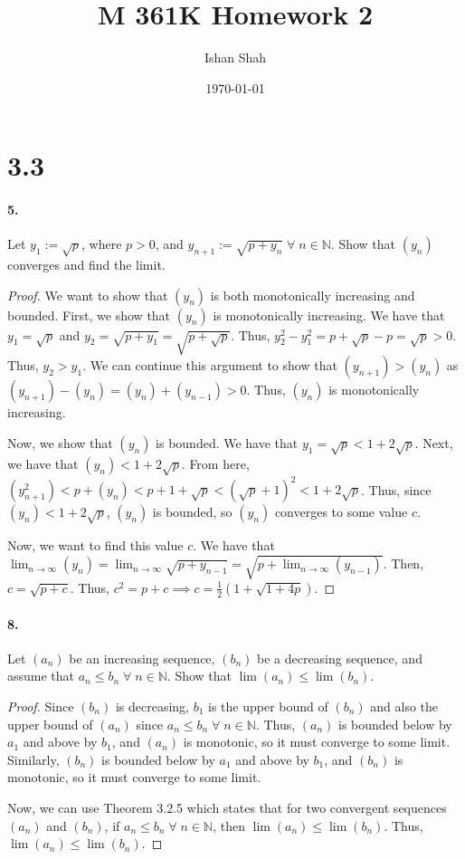 \documentclass[12pt]{article}
\newcommand\N{\mathbb{N}}
\theoremstyle{remark}
\begin{document}
\title{M 361K Homework 2}
\author{Ishan Shah}
\date{\today}
\maketitle

\section*{3.3}
\paragraph{5.} Let $y_1 := \sqrt{p}$, where $p > 0$, and $y_{n + 1} := \sqrt{p + y_n} \;\forall\; n \in \N$. Show that $(y_n)$ converges and find the limit.
\begin{proof}
    We want to show that $(y_n)$ is both monotonically increasing and bounded. First, we show that $(y_n)$ is monotonically increasing. We have that $y_1 = \sqrt{p}$ and $y_2 = \sqrt{p + y_1} = \sqrt{p + \sqrt{p}}$. Thus, $y_2^2 - y_1^2 = p + \sqrt{p} - p = \sqrt{p} > 0$. Thus, $y_2 > y_1$. We can continue this argument to show that $(y_{n + 1}) > (y_n)$ as $(y_{n + 1}) - (y_n) = (y_n) + (y_{n - 1}) > 0$. Thus, $(y_n)$ is monotonically increasing.
    
    Now, we show that $(y_n)$ is bounded. We have that $y_1 = \sqrt{p} < 1 + 2\sqrt{p}$. Next, we have that $(y_n) < 1 + 2\sqrt{p}$. From here, $(y_{n + 1}^2) < p + (y_n) < p + 1 + \sqrt{p} < (\sqrt{p} + 1)^2 < 1 + 2\sqrt{p}$. Thus, since $(y_n) < 1 + 2\sqrt{p}$, $(y_n)$ is bounded, so $(y_n)$ converges to some value $c$.

    Now, we want to find this value $c$. We have that $\lim_{n \to \infty} (y_n) = \lim_{n \to \infty} \sqrt{p + y_{n - 1}} = \sqrt{p + \lim_{n \to \infty} (y_{n - 1})}$. Then, $c = \sqrt{p + c}$. Thus, $c^2 = p + c \implies c = \frac{1}{2}(1 + \sqrt{1 + 4p})$.
\end{proof}

\paragraph{8.} Let $(a_n)$ be an increasing sequence, $(b_n)$ be a decreasing sequence, and assume that $a_n \leq b_n \;\forall\; n \in \N$. Show that $\lim(a_n) \leq \lim(b_n)$.
\begin{proof}
    Since $(b_n)$ is decreasing, $b_1$ is the upper bound of $(b_n)$ and also the upper bound of $(a_n)$ since $a_n \leq b_n \;\forall\; n \in \N$. Thus, $(a_n)$ is bounded below by $a_1$ and above by $b_1$, and $(a_n)$ is monotonic, so it must converge to some limit. Similarly, $(b_n)$ is bounded below by $a_1$ and above by $b_1$, and $(b_n)$ is monotonic, so it must converge to some limit.

    Now, we can use Theorem 3.2.5 which states that for two convergent sequences $(a_n)$ and $(b_n)$, if $a_n \leq b_n \;\forall\; n \in \N$, then $\lim(a_n) \leq \lim(b_n)$. Thus, $\lim(a_n) \leq \lim(b_n)$.
\end{proof}
\end{document}
